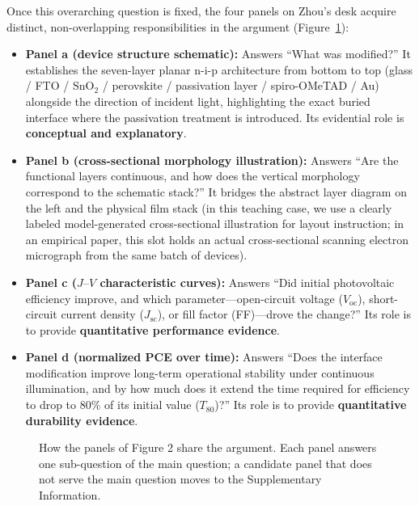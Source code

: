 Once this overarching question is fixed, the four panels on Zhou's desk acquire distinct, non-overlapping responsibilities in the argument (Figure~\ref{fig:ch09-01}):
\begin{itemize}
\item \textbf{Panel a (device structure schematic):} Answers ``What was modified?'' It establishes the seven-layer planar n-i-p architecture from bottom to top (glass / FTO / $\text{SnO}_2$ / perovskite / passivation layer / spiro-OMeTAD / Au) alongside the direction of incident light, highlighting the exact buried interface where the passivation treatment is introduced. Its evidential role is \textbf{conceptual and explanatory}.
\item \textbf{Panel b (cross-sectional morphology illustration):} Answers ``Are the functional layers continuous, and how does the vertical morphology correspond to the schematic stack?'' It bridges the abstract layer diagram on the left and the physical film stack (in this teaching case, we use a clearly labeled model-generated cross-sectional illustration for layout instruction; in an empirical paper, this slot holds an actual cross-sectional scanning electron micrograph from the same batch of devices).
\item \textbf{Panel c ($J\text{--}V$ characteristic curves):} Answers ``Did initial photovoltaic efficiency improve, and which parameter---open-circuit voltage ($V_{\text{oc}}$), short-circuit current density ($J_{\text{sc}}$), or fill factor (FF)---drove the change?'' Its role is to provide \textbf{quantitative performance evidence}.
\item \textbf{Panel d (normalized PCE over time):} Answers ``Does the interface modification improve long-term operational stability under continuous illumination, and by how much does it extend the time required for efficiency to drop to 80\% of its initial value ($T_{80}$)?'' Its role is to provide \textbf{quantitative durability evidence}.
\end{itemize}

\begin{figure}[htbp]\centering
\resizebox{\linewidth}{!}{}
\caption{How the panels of Figure 2 share the argument. Each panel answers one sub-question of the main question; a candidate panel that does not serve the main question moves to the Supplementary Information.}\label{fig:ch09-01}
\end{figure}


